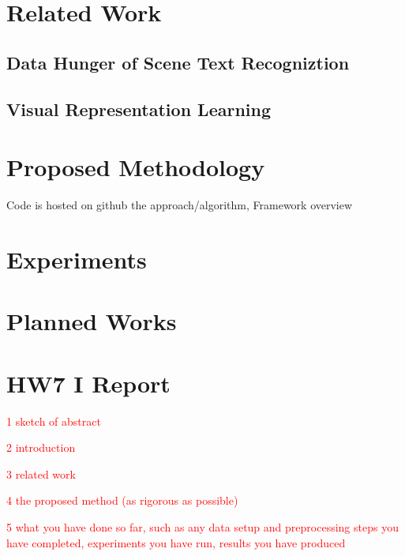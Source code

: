 \documentclass[10pt,twocolumn,letterpaper]{article}
\begin{document}
\section{Related Work}
\label{sec:relwo}
\subsection{Data Hunger of Scene Text Recogniztion}
\subsection{Visual Representation Learning}

\section{Proposed Methodology}
Code is hosted on github \cite{Johnston_Computer_Vision_EKG_2023}
the approach/algorithm, 
Framework overview
\label{sec:meth}

\section{Experiments}
\label{sec:exp}

\section{Planned Works}
\label{sec:exp}





\clearpage


\section{HW7 I Report}
\label{sec:HW7}

\textcolor{red}{1 sketch of abstract}

\textcolor{red}{2 introduction}


\textcolor{red}{3 related work}

\textcolor{red}{4 the proposed method (as rigorous as possible)}

\textcolor{red}{5 what you have done so far, such as any data setup and preprocessing steps you have completed, experiments you have run, results you have produced}
\end{document}
